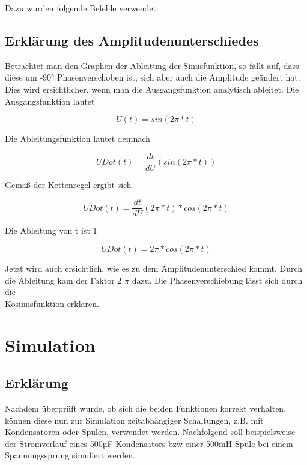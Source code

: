 \documentclass[%
  a4paper, %
  12pt, %
   article, %
  titlepage
]{scrartcl}
\begin{document}
Dazu wurden folgende Befehle verwendet:



\newpage

\subsection{Erklärung des Amplitudenunterschiedes}

Betrachtet man den Graphen der Ableitung der Sinusfunktion, so fällt auf, dass diese um -90° Phasenverschoben ist, sich aber auch die Amplitude geändert hat.
Dies wird ersichtlicher, wenn man die Ausgangsfunktion analytisch ableitet.
Die Ausgangsfunktion lautet


\begin{equation}
U(t) = sin(2\pi*t)
\end{equation}

Die Ableitungsfunktion lautet demnach

\begin{equation}
UDot(t) = \frac{dt}{dU}( sin(2\pi*t))
\end{equation}

Gemäß der Kettenregel ergibt sich


\begin{equation}
UDot(t) =  \frac{dt}{dU}(2\pi*t)*cos(2\pi*t)
\end{equation}

Die Ableitung von t ist 1

\begin{equation}
UDot(t) =  2\pi*cos(2\pi*t)
\end{equation}

Jetzt wird auch ersichtlich, wie es zu dem Amplitudenunterschied kommt. Durch die Ableitung kam der Faktor 2 $\pi$ dazu.
Die Phasenverschiebung lässt sich durch die \\ Kosinusfunktion erklären.

  \section{Simulation}
  \subsection{Erklärung}

Nachdem überprüft wurde, ob sich die beiden Funktionen korrekt verhalten, können diese nun zur Simulation zeitabhängiger Schaltungen, z.B. mit Kondensatoren oder Spulen,
verwendet werden. Nachfolgend soll beispielsweise der Stromverlauf eines 500µF Kondensators bzw einer 500mH Spule  bei einem Spannungssprung simuliert werden. 
\newpage
\end{document}
